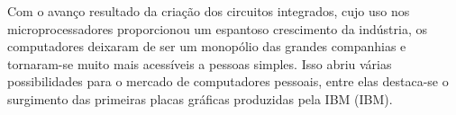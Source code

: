 	\begin{figure}[h!]
		\centering
	\end{figure}
	\nocite{figura1}
	
Com o avanço resultado da criação dos circuitos integrados, cujo uso nos microprocessadores proporcionou um espantoso crescimento da indústria, os computadores deixaram de ser um monopólio das grandes companhias e tornaram-se muito mais acessíveis a pessoas simples. Isso abriu várias possibilidades para o mercado de computadores pessoais, entre elas destaca-se o surgimento das primeiras placas gráficas produzidas pela IBM (\acrlong{IBM}).

    \begin{figure}[h!]
		\centering
	\end{figure}
	\nocite{figura2}
	
